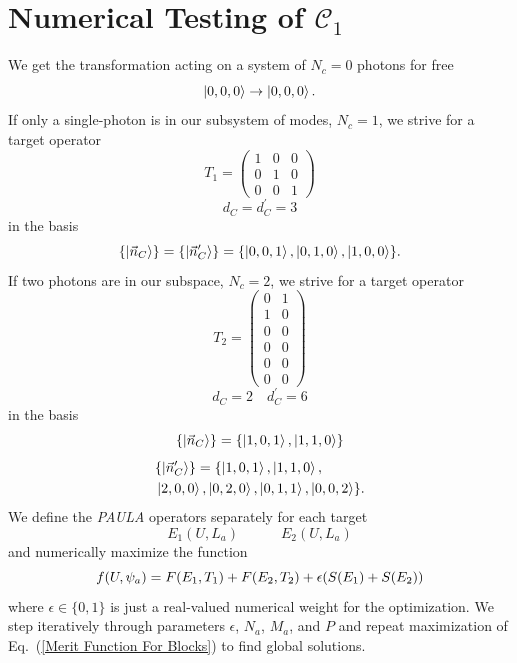 \documentclass[aps,pra,twocolumn,showpacs,superscriptaddress,floatfix,10pt]{revtex4}
\begin{document}
\section{Numerical Testing of $\mathcal{C}_1$}
\label{Section Numerical Testing}
We get the transformation acting on a system of $N_c=0$ photons for free
\begin{equation}
\label{Free Operation}
\ket{0,0,0} \rightarrow \ket{0,0,0}.
\end{equation}
If only a single-photon is in our subsystem of modes, $N_c=1$, we strive for a target operator
\begin{equation}
\label{T1 1C2T}
T_1=	\begin{pmatrix} 1 & 0 & 0  \\ 0 & 1 & 0  \\ 0 & 0 & 1   \end{pmatrix}  
\end{equation}
\begin{equation}
d_C = d_C^\prime = 3
\end{equation}
in the basis
\begin{equation}
\{ \ket{\vec{n}_C} \} = \{ \ket{\vec{n}_C^\prime} \} = \{ \ket{0,0,1},\ket{0,1,0},\ket{1,0,0} \}.
\end{equation}
If two photons are in our subspace, $N_c=2$, we strive for a target operator 
\begin{equation}
\label{T2 1C2T}
T_2=\begin{pmatrix} 0 & 1  \\ 1 & 0  \\ 0 & 0 \\ 0 & 0 \\ 0 & 0 \\ 0 & 0   \end{pmatrix}  
\end{equation}
\begin{equation}
d_C = 2 \quad d_C^\prime = 6
\end{equation}
in the basis
\begin{equation}
\{ \ket{\vec{n}_C} \} = \{ \ket{1,0,1},\ket{1,1,0} \}
\end{equation}
\begin{eqnarray}
& \{ \ket{\vec{n}^\prime_C } \} = \{ \ket{1,0,1},\ket{1,1,0}, \\ &\ket{2,0,0},\ket{0,2,0},\ket{0,1,1},\ket{0,0,2} \}. \nonumber
\end{eqnarray}
We define the \textit{PAULA} operators separately for each target
\begin{equation}
E_1(U,L_a) \quad \quad \quad E_2(U,L_a)
\end{equation}
and numerically maximize the function
\begin{equation}
\label{Merit Function For Blocks}
\small f(U,\psi_a) = F(E_1,T_1) + F(E_2,T_2) +\epsilon (S(E_1) + S(E_2) )
\end{equation}
where $\epsilon \in \{0,1\}$ is just a real-valued numerical weight for the optimization. We step iteratively through parameters $\epsilon$, $N_a$, $M_a$, and $P$ and repeat maximization of Eq.~(\ref{Merit Function For Blocks}) to find global solutions.
\end{document}

